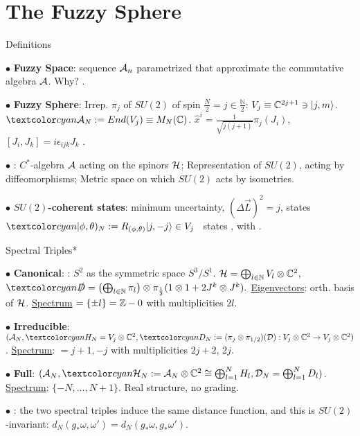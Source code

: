 \section{The Fuzzy Sphere}

\begin{frame}{Definitions} %
    
    $\bullet$ \textbf{Fuzzy Space}: %
    sequence $\mathcal A_n$ parametrized that approximate the commutative algebra $\mathcal A$. Why? .
    
    $\bullet$ \textbf{Fuzzy Sphere}: Irrep. $\pi_j$ of $SU(2)$ of spin $\frac{N}{2} = j \in \frac{\mathbb N}{2}$: $V_j \equiv \mathbb C^{2j+1} \ni |j, m\rangle$. $\lbtext{\acal_N}:= End(V_j) \equiv M_N(\CC)$. $\hat x^i = \frac{1}{\sqrt{j(j+1)}} \pi_{j}(J_i)$, $[J_i, J_k] = i \epsilon_{ijk} J_k$ \then {}.
    
    $\bullet$ :  $C^*$-algebra $\mathcal A$ acting on the spinors $\mathcal H$;  Representation of $SU(2)$, acting by diffeomorphisms;   Metric space on which $SU(2)$ acts by isometries.
    
    $\bullet$ \textbf{$SU(2)$-coherent states}: minimum uncertainty, $(\Delta \vec L)^2=j$, states $\lbtext{|\phi, \theta)_N} := R_{(\phi, \theta)}|j, -j\rangle \in V_j$ \iff\ states  , with .
    
\end{frame}


\begin{frame}{Spectral Triples*} %
    
     $\bullet$ \textbf{Canonical}: : $S^2$ as the symmetric space $S^3/S^1$. $\mathcal H = \bigoplus_{l \in \mathbb N} V_l \otimes \mathbb C^2$, $\lbtext{\slashed D} = \left( \bigoplus_{l \in \NN} \pi_l \right) \otimes \pi_{\frac{1}{2}}(1\otimes 1 + 2 J^k \otimes J^k).$ \underline{Eigenvectors}: orth. basis of $\mathcal H$. \underline{Spectrum} $= \{\pm l\} = \mathbb Z - 0$ with multiplicities $2l$.
     
     $\bullet$ \textbf{Irreducible}: $(\acal_N, \lbtext{H_N} = V_j \otimes \CC^2, \lbtext{D_N} 
    := (\pi_j \otimes \pi_{1/2})(\mathcal D): V_j \otimes \CC^2 \to V_j \otimes \CC^2)$. \underline{Spectrum}: $= j+1, -j$ with multiplicities $2j+2$, $2j$. 
     
     $\bullet$ \textbf{Full}: $(\acal_N, \lbtext{\hcal_N} := \mathcal A_N \otimes \CC^2 \cong \bigoplus_{l =1}^N H_l, \mathcal D_N = \bigoplus_{l =1}^N D_l)$. \underline{Spectrum}: $\{-N, \dots, N+1\}$. Real structure, no grading.
     
     $\bullet$ \textbf{}: the two spectral triples induce the same distance function, and this is $SU(2)$-invariant: $d_N(g_* \omega, \omega') = d_N(g_* \omega, g_*\omega')$.
    
\end{frame}


